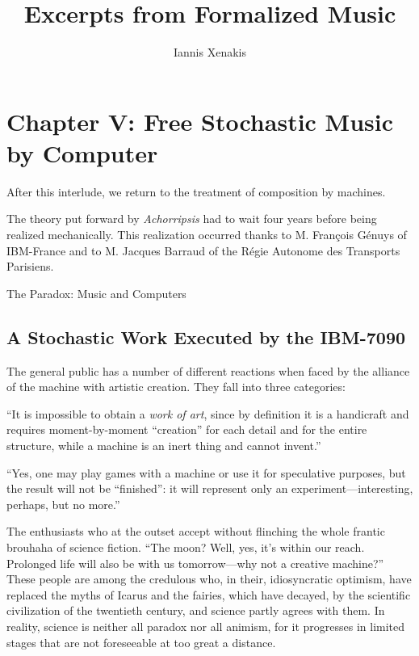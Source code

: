 \documentclass[letterpaper, 11pt]{article}
\title{Excerpts from Formalized Music}
\author{Iannis Xenakis}
\date{}
\begin{document}
\maketitle

\section*{Chapter V: Free Stochastic Music by Computer}

After this interlude, we return to the treatment of composition by machines.

The theory put forward by \textit{Achorripsis} had to wait four years before being realized mechanically.
This realization occurred thanks to M. François Génuys of IBM-France and to M. Jacques Barraud of the Régie Autonome des Transports Parisiens.

\begin{center}
    \Large The Paradox: Music and Computers
\end{center}

\subsection*{A Stochastic Work Executed by the IBM-7090}

The general public has a number of different reactions when faced by the alliance of the machine with artistic creation.
They fall into three categories:

``It is impossible to obtain a \textit{work of art}, since by definition it is a handicraft and requires moment-by-moment ``creation'' for each detail and for the entire structure, while a machine is an inert thing and cannot invent.''

``Yes, one may play games with a machine or use it for speculative purposes, but the result will not be ``finished'': it will represent only an experiment---interesting, perhaps, but no more.''

The enthusiasts who at the outset accept without flinching the whole frantic brouhaha of science fiction.
``The moon? Well, yes, it's within our reach.
Prolonged life will also be with us tomorrow---why not a creative machine?''
These people are among the credulous who, in their, idiosyncratic optimism, have replaced the myths of Icarus and the fairies, which have decayed, by the scientific civilization of the twentieth century, and science partly agrees with them.
In reality, science is neither all paradox nor all animism, for it progresses in limited stages that are not foreseeable at too great a distance.
\end{document}
